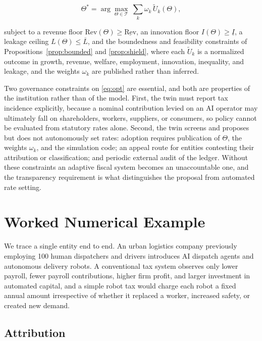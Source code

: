 \documentclass[journal]{IEEEtran}
\theoremstyle{plain}
\theoremstyle{definition}
\newcommand{\Rev}{\mathrm{Rev}}
\begin{document}
\begin{equation}
\label{eq:opt}
\Theta^{*} = \arg\max_{\Theta\in\mathcal{T}}\ \sum_{k} \omega_k\,\widetilde{U}_k(\Theta),
\end{equation}

subject to a revenue floor $\Rev(\Theta) \ge \underline{\Rev}$, an innovation floor $I(\Theta) \ge \underline{I}$, a leakage ceiling $L(\Theta) \le \overline{L}$, and the boundedness and feasibility constraints of Propositions~\ref{prop:bounded} and \ref{prop:shield}, where each $\widetilde{U}_k$ is a normalized outcome in growth, revenue, welfare, employment, innovation, inequality, and leakage, and the weights $\omega_k$ are published rather than inferred.

Two governance constraints on \eqref{eq:opt} are essential, and both are properties of the institution rather than of the model. First, the twin must report tax incidence explicitly, because a nominal contribution levied on an AI operator may ultimately fall on shareholders, workers, suppliers, or consumers, so policy cannot be evaluated from statutory rates alone. Second, the twin screens and proposes but does not autonomously set rates: adoption requires publication of $\Theta$, the weights $\omega_k$, and the simulation code; an appeal route for entities contesting their attribution or classification; and periodic external audit of the ledger. Without these constraints an adaptive fiscal system becomes an unaccountable one, and the transparency requirement is what distinguishes the proposal from automated rate setting.

\section{Worked Numerical Example}
\label{sec:example}

We trace a single entity end to end. An urban logistics company previously employing 100 human dispatchers and drivers introduces AI dispatch agents and autonomous delivery robots. A conventional tax system observes only lower payroll, fewer payroll contributions, higher firm profit, and larger investment in automated capital, and a simple robot tax would charge each robot a fixed annual amount irrespective of whether it replaced a worker, increased safety, or created new demand.

\subsection{Attribution}
\end{document}
